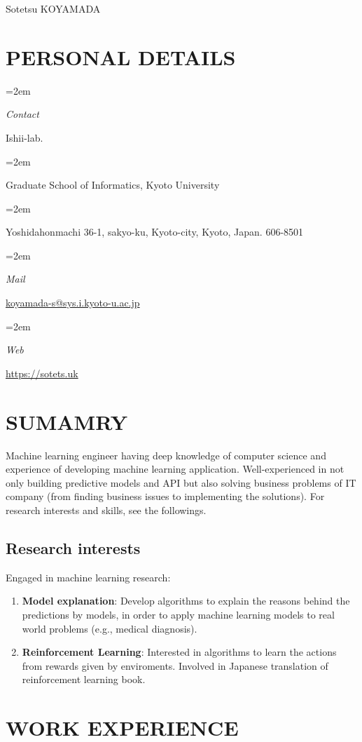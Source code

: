 \documentclass[paper=a4,fontsize=11pt]{scrartcl} %
\newlength{\spacebox}
\newcommand{\sepspace}{\vspace*{1em}}		%
\newcommand{\MyName}[1]{ %
		\Huge \usefont{OT1}{phv}{b}{n} \hfill #1
		\par \normalsize \normalfont}
\newcommand{\MySlogan}[1]{ %
		\large \usefont{OT1}{phv}{m}{n}\hfill \textit{#1}
		\par \normalsize \normalfont}
\newcommand{\NewPart}[1]{\section*{\uppercase{#1}}}
\newcommand{\PersonalEntry}[2]{
		\noindent\hangindent=2em\hangafter=0 %
		\parbox{\spacebox}{        %
		\textit{#1}}		       %
		\hspace{1.5em} #2 \par}    %
\begin{document}

\MyName{Sotetsu KOYAMADA}

\sepspace

\NewPart{Personal details}{}

\PersonalEntry{Contact}{Ishii-lab.}
\PersonalEntry{}{Graduate School of Informatics, Kyoto University}
\PersonalEntry{}{Yoshidahonmachi 36-1, sakyo-ku, Kyoto-city, Kyoto, Japan. 606-8501}
\PersonalEntry{Mail}{\url{koyamada-s@sys.i.kyoto-u.ac.jp}}
\PersonalEntry{Web}{\url{https://sotets.uk}}

\NewPart{Sumamry}{}

Machine learning engineer
having deep knowledge of computer science and
experience of developing machine learning application.
Well-experienced in not only building predictive models and API
but also solving business problems of IT company (from finding business issues to implementing the solutions).
For research interests and skills, see the followings.

\subsection*{Research interests}
Engaged in machine learning research:

\begin{enumerate}
  \item {\bf Model explanation}: Develop algorithms to explain the reasons behind the predictions by models, in order to apply machine learning models to real world problems (e.g., medical diagnosis).
	\item {\bf Reinforcement Learning}: Interested in algorithms to learn the actions from rewards given by enviroments. Involved in Japanese translation of reinforcement learning book.
\end{enumerate}

\NewPart{Work experience}{}
\end{document}
